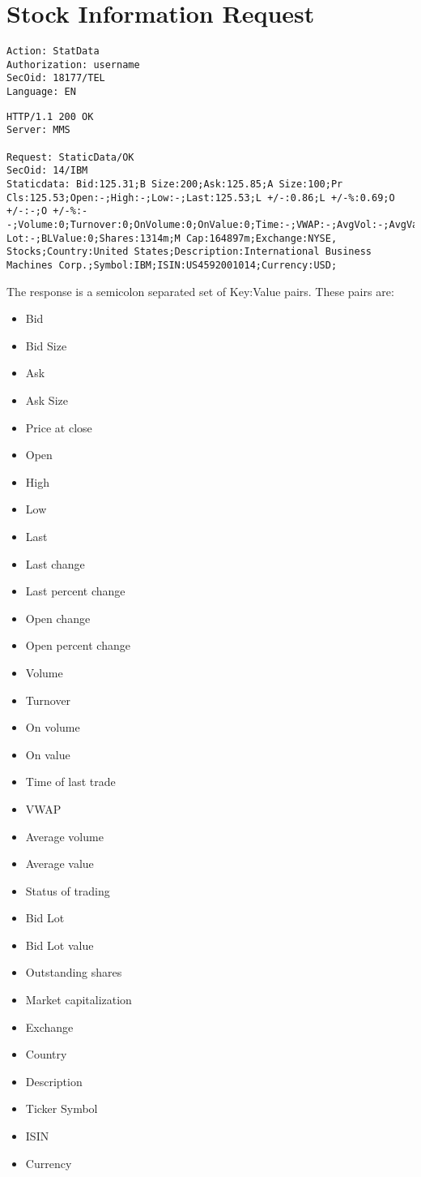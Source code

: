 \documentclass[12pt,twoside,letterpaper]{report}
\begin{document}
\section*{Stock Information Request}
\begin{verbatim}
Action: StatData
Authorization: username
SecOid: 18177/TEL
Language: EN
\end{verbatim}

\begin{verbatim}
HTTP/1.1 200 OK
Server: MMS

Request: StaticData/OK
SecOid: 14/IBM
Staticdata: Bid:125.31;B Size:200;Ask:125.85;A Size:100;Pr Cls:125.53;Open:-;High:-;Low:-;Last:125.53;L +/-:0.86;L +/-%:0.69;O +/-:-;O +/-%:--;Volume:0;Turnover:0;OnVolume:0;OnValue:0;Time:-;VWAP:-;AvgVol:-;AvgVal:-;Status:;B Lot:-;BLValue:0;Shares:1314m;M Cap:164897m;Exchange:NYSE, Stocks;Country:United States;Description:International Business Machines Corp.;Symbol:IBM;ISIN:US4592001014;Currency:USD;
\end{verbatim}

The response is a semicolon separated set of Key:Value pairs. These pairs are:
\begin{itemize}
\item Bid
\item Bid Size
\item Ask
\item Ask Size
\item Price at close
\item Open
\item High
\item Low
\item Last
\item Last change
\item Last percent change
\item Open change
\item Open percent change
\item Volume
\item Turnover
\item On volume
\item On value
\item Time of last trade
\item VWAP
\item Average volume
\item Average value
\item Status of trading
\item Bid Lot
\item Bid Lot value
\item Outstanding shares
\item Market capitalization
\item Exchange
\item Country
\item Description
\item Ticker Symbol
\item ISIN
\item Currency
\end{itemize}
\end{document}
